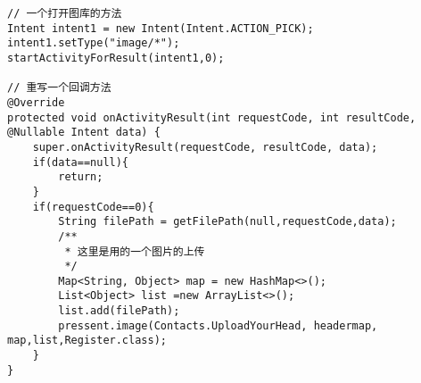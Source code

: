 \documentclass[9pt, b5paper]{article}
\begin{document}
\begin{verbatim}
// 一个打开图库的方法
Intent intent1 = new Intent(Intent.ACTION_PICK);
intent1.setType("image/*");
startActivityForResult(intent1,0);

// 重写一个回调方法
@Override
protected void onActivityResult(int requestCode, int resultCode, @Nullable Intent data) {
    super.onActivityResult(requestCode, resultCode, data);
    if(data==null){
        return;
    }
    if(requestCode==0){
        String filePath = getFilePath(null,requestCode,data);
        /**
         * 这里是用的一个图片的上传
         */
        Map<String, Object> map = new HashMap<>();
        List<Object> list =new ArrayList<>();
        list.add(filePath);
        pressent.image(Contacts.UploadYourHead, headermap, map,list,Register.class);
    }
}
\end{verbatim}
\end{document}
